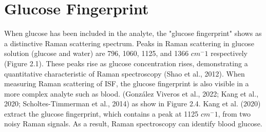 \section{Glucose Fingerprint}
When glucose has been included in the analyte, the "glucose fingerprint" shows as a distinctive Raman scattering spectrum. Peaks in Raman scattering in glucose solution (glucose and water) are 796, 1060, 1125, and 1366 $cm^-1$ respectively (Figure 2.1). These peaks rise as glucose concentration rises, demonstrating a quantitative characteristic of Raman spectroscopy (Shao et al., 2012).
When measuring Raman scattering of ISF, the glucose fingerprint is also visible in a more complex analyte such as blood. (González Viveros et al., 2022; Kang et al., 2020; Scholtes-Timmerman et al., 2014) as show in Figure 2.4. Kang et al. (2020) extract the glucose fingerprint, which contains a peak at 1125 $cm^-1$, from two noisy Raman signals. As a result, Raman spectroscopy can identify blood glucose.

